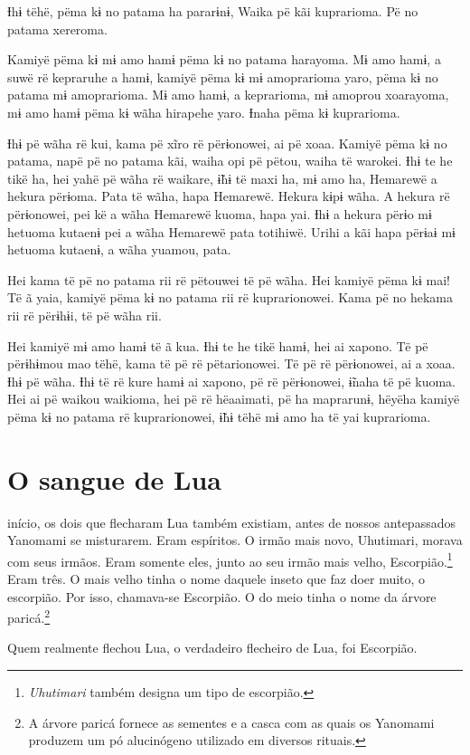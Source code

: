 Ɨhɨ tëhë, pëma kɨ no patama ha pararɨnɨ, Waika pë kãi kuprarioma. Pë no
patama xereroma. 

Kamiyë pëma kɨ mɨ amo hamɨ pëma kɨ no patama harayoma. Mɨ amo hamɨ, a
suwë rë kepraruhe a hamɨ, kamiyë pëma kɨ mɨ amoprarioma yaro, pëma kɨ no
patama mɨ amoprarioma. Mɨ amo hamɨ, a keprarioma, mɨ amoprou xoarayoma,
mɨ amo hamɨ pëma kɨ wãha hirapehe yaro. Ɨnaha pëma kɨ kuprarioma. 

Ɨhɨ pë wãha rë kui, kama pë xĩro rë përɨonowei, ai pë xoaa. Kamiyë pëma
kɨ no patama, napë pë no patama kãi, waiha opi pë pëtou, waiha të
warokei. Ɨhɨ te he tikë ha, hei yahë pë wãha rë waikare, ɨ̃hɨ të maxi ha,
mɨ amo ha, Hemarewë a hekura përɨoma. Pata të wãha, hapa Hemarewë.
Hekura kɨpɨ wãha. A hekura rë përɨonowei, pei kë a wãha Hemarewë kuoma,
hapa yai. Ɨhɨ a hekura përɨo mɨ hetuoma kutaenɨ pei a wãha Hemarewë pata
totihiwë. Urihi a kãi hapa përɨaɨ mɨ hetuoma kutaenɨ, a wãha yuamou,
pata. 

Hei kama të pë no patama rii rë pëtouwei të pë wãha. Hei kamiyë pëma kɨ
mai! Të ã yaia, kamiyë pëma kɨ no patama rii rë kuprarionowei. Kama pë
no hekama rii rë përɨhɨi, të pë wãha rii. 

Hei kamiyë mɨ amo hamɨ të ã kua. Ɨhɨ te he tikë hamɨ, hei ai xapono. Të
pë përɨhɨmou mao tëhë, kama të pë rë pëtarionowei. Të pë rë përɨonowei,
ai a xoaa. Ɨhɨ pë wãha. Ɨhɨ të rë kure hamɨ ai xapono, pë rë përɨonowei,
ɨ̃naha të pë kuoma. Hei ai pë waikou waikioma, hei pë rë hëaaimati, pë ha
maprarunɨ, hëyëha kamiyë pëma kɨ no patama rë kuprarionowei, ɨ̃hɨ tëhë mɨ
amo ha të yai kuprarioma. 

\chapter{O sangue de Lua}
 \enlargethispage{\baselineskip}
 início, os dois que flecharam Lua também existiam, antes de nossos
antepassados Yanomami se misturarem. Eram espíritos. O irmão mais novo,
Uhutimari, morava com seus irmãos. Eram somente eles, junto ao seu irmão
mais velho, Escorpião.\footnote{\textit{Uhutimari} também designa um tipo de escorpião.} Eram três. O mais velho tinha o nome daquele
inseto que faz doer muito, o escorpião. Por isso, chamava-se Escorpião.
O do meio tinha o nome da árvore paricá.\footnote{A árvore paricá fornece as sementes e a casca com as quais os Yanomami
produzem um pó alucinógeno utilizado em diversos rituais.} 

Quem realmente flechou Lua, o verdadeiro flecheiro de Lua, foi
Escorpião. 

